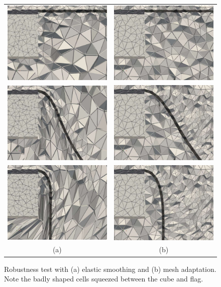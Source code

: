 \begin{figure}[!h]
\begin{center}
\begin{tabular}{cc}
\includegraphics[height=0.24\linewidth]{chapters/hoffman-2/eps/force_smooth01.eps} &
\includegraphics[height=0.24\linewidth]{chapters/hoffman-2/eps/force_hybrid01.eps}\\
\includegraphics[height=0.24\linewidth]{chapters/hoffman-2/eps/force_smooth02.eps} &
\includegraphics[height=0.24\linewidth]{chapters/hoffman-2/eps/force_hybrid02.eps}\\
\includegraphics[height=0.24\linewidth]{chapters/hoffman-2/eps/force_smooth03.eps} &
\includegraphics[height=0.24\linewidth]{chapters/hoffman-2/eps/force_hybrid03.eps}\\
(a) & (b)
\end{tabular}
\end{center}
\caption{Robustness test with (a) elastic smoothing and (b) mesh adaptation. Note the badly shaped cells squeezed between the cube and flag.}
\label{fig:flag_robustness}
\end{figure}

